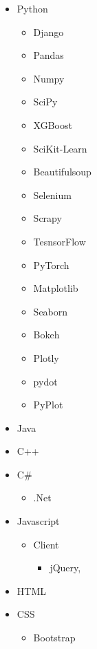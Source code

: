 \documentclass[10pt,a4paper,sans]{moderncv} %
\begin{document}
	\begin{cvcolumns}
		{
			\begin{itemize}
				\item Python
				\begin{itemize}
					\item Django
					\item Pandas
					\item Numpy
					\item SciPy
					\item XGBoost
					\item SciKit-Learn
					\item Beautifulsoup
					\item Selenium
					\item Scrapy
					\item TesnsorFlow
					\item PyTorch
					\item Matplotlib
					\item Seaborn
					\item Bokeh
					\item Plotly
		            \item pydot
					\item PyPlot
				\end{itemize}
				\item Java
				\item C++
				\item C\#
				\begin{itemize}
					\item .Net
				\end{itemize}
				\item Javascript
				\begin{itemize}
					\item Client
					\begin{itemize}
						\item jQuery,
					\end{itemize}
				\end{itemize}
				\item HTML
				\item CSS
				\begin{itemize}
					\item Bootstrap
				\end{itemize}
			\end{itemize}
		}
		

\end{cvcolumns}
\end{document}
